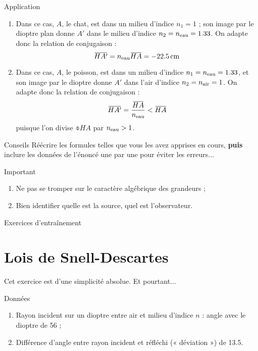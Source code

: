 \documentclass[10pt,a5paper,notitlepage]{book}
\begin{document}
\begin{NCexem}{Application}
    \begin{enumerate}
        \item Dans ce cas, $A$, le chat, est dans un milieu d'indice $n_1 = 1$ ;
            son image par le dioptre plan donne $A'$ dans le milieu d'indice
            $n_2 = n _{\text{eau}} = 1.33$. On adapte donc la relation de conjugaison
            :
        \[ \obar{HA'} = n \St{eau}\obar{HA} = \SI{-22.5}{cm}\]
        \item Dans ce cas, $A$, le poisson, est dans un milieu d'indice $n_1 = n
            _{\text{eau}} = 1.33$, et son image par le dioptre donne $A'$ dans l'air
            d'indice $n_2 = n _{\text{air}} = 1$. On adapte donc la relation de
            conjugaison :
            \[ \obar{HA'} = \frac{\obar{HA}}{n \St{eau}} < \obar{HA} \]
            puisque l'on divise $\obar{HA}$ par $n _{\text{eau}} > 1$.
    \end{enumerate}
\end{NCexem}

\begin{NCcoro}{Conseils}
    Réécrire les formules telles que vous les avez apprises en cours,
    \textbf{puis} inclure les données de l'énoncé une par une pour éviter les
    erreurs...
\end{NCcoro}

\begin{NCimpo}{Important}
    \begin{enumerate}
        \item Ne pas se tromper sur le caractère {\huge algébrique} des
            grandeurs ;
        \item Bien identifier quelle est la source, quel est l'observateur.
    \end{enumerate}
\end{NCimpo}

\begin{center}
    \Huge Exercices d'entraînement
\end{center}

\setcounter{section}{5}
\section{Lois de Snell-Descartes}
Cet exercice est d'une simplicité absolue. Et pourtant...
\begin{NCdefi}{Données}
    \begin{enumerate}
        \item Rayon incident sur un dioptre entre air et milieu d'indice $n$ :
            angle {\huge avec le dioptre} de \SI{56}{\degres} ;
        \item Différence d'angle entre rayon incident et réfléchi (« déviation
            ») de \SI{13.5}{\degres}.
    \end{enumerate}
\end{NCdefi}
\end{document}
